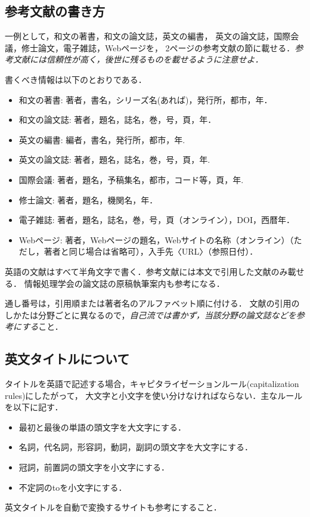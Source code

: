 \documentclass[10pt,a4paper,notitlepage,oneside,twocolumn]{abst_jsarticle}
\begin{document}
\subsection{参考文献の書き方} \label{subsec:section23}

一例として，和文の著書\cite{suetake}，和文の論文誌\cite{kusano}，英文の編書\cite{fuortes}，
英文の論文誌\cite{rice}，国際会議\cite{guibas}，修士論文\cite{chudai}，電子雑誌\cite{iwama}，Webページ\cite{IPSJ}を，
2ページの参考文献の節に載せる．{\em 参考文献には信頼性が高く，後世に残るものを載せるように注意せよ．}

書くべき情報は以下のとおりである．
\begin{itemize}
\item 和文の著書: 著者，書名，シリーズ名(あれば)，発行所，都市，年．
\item 和文の論文誌: 著者，題名，誌名，巻，号，頁，年．
\item 英文の編書: 編者，書名，発行所，都市，年. 
\item 英文の論文誌: 著者，題名，誌名，巻，号，頁，年.
\item 国際会議: 著者，題名，予稿集名，都市，コード等，頁，年.
\item 修士論文: 著者，題名，機関名，年．
\item 電子雑誌: 著者，題名，誌名，巻，号，頁（オンライン），DOI，西暦年．
\item Webページ: 著者，Webページの題名，Webサイトの名称（オンライン）（ただし，著者と同じ場合は省略可），入手先〈URL〉（参照日付）．
\end{itemize}
英語の文献はすべて半角文字で書く．参考文献には本文で引用した文献のみ載せる．
情報処理学会の論文誌の原稿執筆案内\cite{IPSJ}も参考になる．

通し番号は，引用順または著者名のアルファベット順に付ける．
文献の引用のしかたは分野ごとに異なるので，{\em 自己流では書かず，当該分野の論文誌などを参考にする}こと．


\subsection{英文タイトルについて}

タイトルを英語で記述する場合，キャピタライゼーションルール(capitalization rules)にしたがって，
大文字と小文字を使い分けなければならない．主なルールを以下に記す．
\begin{itemize}
\item 最初と最後の単語の頭文字を大文字にする．
\item 名詞，代名詞，形容詞，動詞，副詞の頭文字を大文字にする．
\item 冠詞，前置詞の頭文字を小文字にする．
\item 不定詞のtoを小文字にする．
\end{itemize}
英文タイトルを自動で変換するサイト\cite{cap}も参考にすること．
\end{document}
